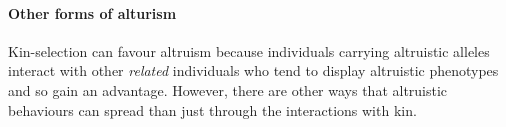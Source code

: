







\paragraph{Other forms of alturism}
Kin-selection can favour altruism because individuals carrying
altruistic alleles interact with other \emph{ related} individuals who tend to display altruistic phenotypes and so gain an advantage. However, there are other ways that altruistic behaviours can spread than just through the interactions with kin.

